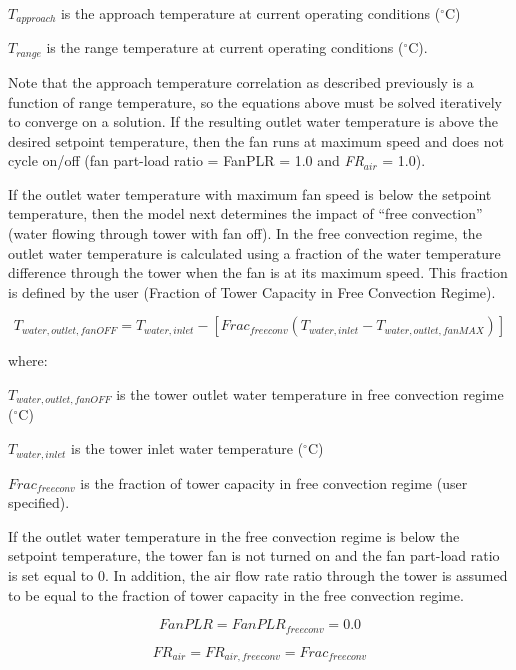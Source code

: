 \({T_{approach}}\) is the approach temperature at current operating conditions (\(^{\circ}\)C)

\({T_{range}}\) is the range temperature at current operating conditions (\(^{\circ}\)C).

Note that the approach temperature correlation as described previously is a function of range temperature, so the equations above must be solved iteratively to converge on a solution. If the resulting outlet water temperature is above the desired setpoint temperature, then the fan runs at maximum speed and does not cycle on/off (fan part-load ratio = FanPLR = 1.0 and \emph{FR\(_{air}\)} = 1.0).

If the outlet water temperature with maximum fan speed is below the setpoint temperature, then the model next determines the impact of ``free convection'' (water flowing through tower with fan off). In the free convection regime, the outlet water temperature is calculated using a fraction of the water temperature difference through the tower when the fan is at its maximum speed. This fraction is defined by the user (Fraction of Tower Capacity in Free Convection Regime).

\begin{equation}
{T_{water,outlet,fanOFF}} = {T_{water,inlet}} - \left[ {Fra{c_{freeconv}}\left( {{T_{water,inlet}} - {T_{water,outlet,fanMAX}}} \right)} \right]
\end{equation}

where:

\({T_{water,outlet,fanOFF}}\) is the tower outlet water temperature in free convection regime (\(^{\circ}\)C)

\({T_{water,inlet}}\) is the tower inlet water temperature (\(^{\circ}\)C)

\(Fra{c_{freeconv}}\) is the fraction of tower capacity in free convection regime (user specified).

If the outlet water temperature in the free convection regime is below the setpoint temperature, the tower fan is not turned on and the fan part-load ratio is set equal to 0. In addition, the air flow rate ratio through the tower is assumed to be equal to the fraction of tower capacity in the free convection regime.

\begin{equation}
FanPLR = FanPL{R_{freeconv}} = 0.0
\end{equation}

\begin{equation}
F{R_{air}} = F{R_{air,freeconv}} = Fra{c_{freeconv}}
\end{equation}

